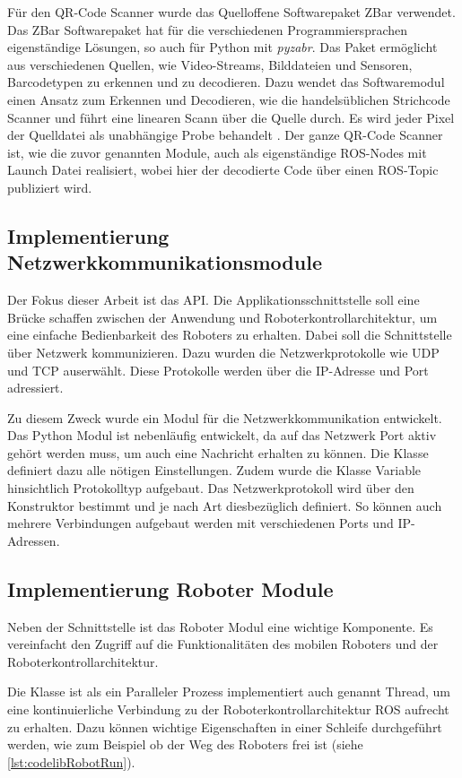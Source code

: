 Für den QR-Code Scanner wurde das Quelloffene Softwarepaket ZBar verwendet. Das ZBar Softwarepaket hat für die verschiedenen Programmiersprachen eigenständige Lösungen, so auch für Python mit \textit{pyzabr}. Das Paket ermöglicht aus verschiedenen Quellen, wie Video-Streams, Bilddateien und Sensoren, Barcodetypen zu erkennen und zu decodieren. Dazu wendet das Softwaremodul einen Ansatz zum Erkennen und Decodieren, wie die handelsüblichen Strichcode Scanner und führt eine linearen Scann über die Quelle durch. Es wird jeder Pixel der Quelldatei als unabhängige Probe behandelt \cite{zbar.2011}. Der ganze QR-Code Scanner ist, wie die zuvor genannten Module, auch als eigenständige ROS-Nodes mit Launch Datei realisiert, wobei hier der decodierte Code über einen ROS-Topic publiziert wird.  

\subsection{Implementierung Netzwerkkommunikationsmodule} 

Der Fokus dieser Arbeit ist das API. Die Applikationsschnittstelle soll eine Brücke schaffen zwischen der Anwendung und Roboterkontrollarchitektur, um eine einfache Bedienbarkeit des Roboters zu erhalten. Dabei soll die Schnittstelle über Netzwerk kommunizieren. Dazu wurden die Netzwerkprotokolle wie UDP und TCP auserwählt. Diese Protokolle werden über die IP-Adresse und Port adressiert.  

Zu diesem Zweck wurde ein Modul für die Netzwerkkommunikation entwickelt. Das Python Modul ist nebenläufig entwickelt, da auf das Netzwerk Port aktiv gehört werden muss, um auch eine Nachricht erhalten zu können. Die Klasse definiert dazu alle nötigen Einstellungen. Zudem wurde die Klasse Variable hinsichtlich Protokolltyp aufgebaut. Das Netzwerkprotokoll wird über den Konstruktor bestimmt und je nach Art diesbezüglich definiert. So können auch mehrere Verbindungen aufgebaut werden mit verschiedenen Ports und IP-Adressen. 

\subsection{Implementierung Roboter Module}\label{implRoboterModule}

Neben der Schnittstelle ist das Roboter Modul eine wichtige Komponente. Es vereinfacht den Zugriff auf die Funktionalitäten des mobilen Roboters und der Roboterkontrollarchitektur.  

Die Klasse ist als ein Paralleler Prozess implementiert auch genannt Thread, um eine kontinuierliche Verbindung zu der Roboterkontrollarchitektur ROS aufrecht zu erhalten. Dazu können wichtige Eigenschaften in einer Schleife durchgeführt werden, wie zum Beispiel ob der Weg des Roboters frei ist (siehe \autoref{lst:codelibRobotRun}). 

